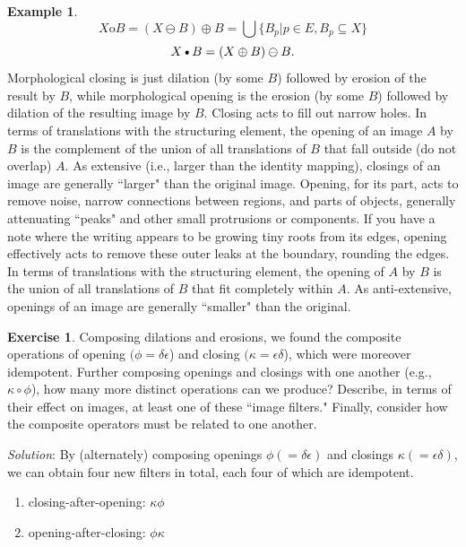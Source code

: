 \documentclass[11pt]{book}
\theoremstyle{definition}
\newtheorem{example}{Example}[section]
\theoremstyle{definition}
\theoremstyle{definition}
\theoremstyle{theorem}
\theoremstyle{definition}
\newtheorem{exercise}{Exercise}[section]
\begin{document}
\begin{example}
	\begin{equation}
	X \text{o} B = (X \ominus B) \oplus B = \bigcup \{B_p | p \in E, B_p \subseteq  X\}
	\end{equation}
	\begin{equation}
	X \text{\textbullet} B = (X \oplus B) \ominus B.
	\end{equation}
	Morphological closing is just dilation (by some $B$) followed by erosion of the result by $B$, while morphological opening is the erosion (by some $B$) followed by dilation of the resulting image by $B$. Closing acts to fill out narrow holes. In terms of translations with the structuring element, the opening of an image $A$ by $B$ is the complement of the union of all translations of $B$ that fall outside (do not overlap) $A$. As extensive (i.e., larger than the identity mapping), closings of an image are generally ``larger" than the original image. Opening, for its part, acts to remove noise, narrow connections between regions, and parts of objects, generally attenuating ``peaks" and other small protrusions or components. If you have a note where the writing appears to be growing tiny roots from its edges, opening effectively acts to remove these outer leaks at the boundary, rounding the edges. In terms of translations with the structuring element, the opening of $A$ by $B$ is the union of all translations of $B$ that fit completely within $A$. As anti-extensive, openings of an image are generally ``smaller" than the original. 
	\begin{exercise}
		Composing dilations and erosions, we found the composite operations of opening $(\phi = \delta \epsilon$) and closing $(\kappa = \epsilon \delta$), which were moreover idempotent. Further composing openings and closings with one another (e.g., $\kappa \circ \phi$), how many more distinct operations can we produce? Describe, in terms of their effect on images, at least one of these ``image filters." Finally, consider how the composite operators must be related to one another.   
	\end{exercise}
	\noindent
	\textit{Solution}: By (alternately) composing openings $\phi (= \delta \epsilon)$ and closings $\kappa (= \epsilon \delta)$, we can obtain four new filters in total, each four of which are idempotent. 
	\begin{enumerate}
		\item closing-after-opening: $\kappa \phi$
		\item opening-after-closing: $\phi \kappa$

\end{enumerate}
\end{example}
\end{document}
